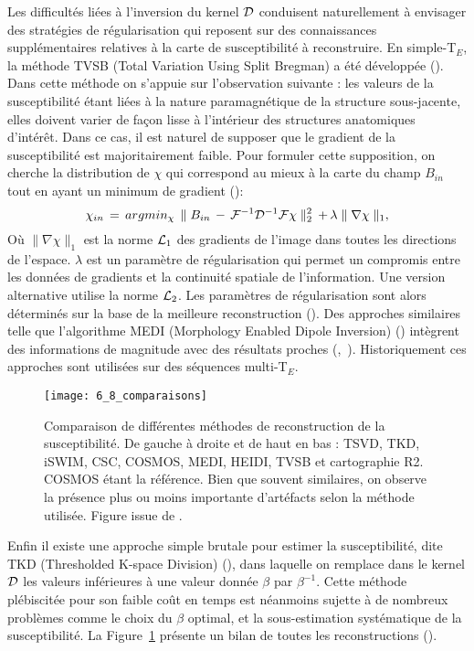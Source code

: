 {Les difficultés liées à l’inversion du kernel ${\cal D}$ conduisent naturellement à envisager des
stratégies de régularisation qui reposent sur des connaissances supplémentaires relatives à la carte de
susceptibilité à reconstruire. En simple-T$_E$, la méthode TVSB (Total Variation Using Split Bregman) a
été développée (\cite{Bilgic2012}). Dans cette méthode on s’appuie sur l’observation suivante : les valeurs de la
susceptibilité étant liées à la nature paramagnétique de la structure sous-jacente, elles doivent varier
de façon lisse à l'intérieur des structures anatomiques d’intérêt. Dans ce cas, il est naturel de supposer
que le gradient de la susceptibilité est majoritairement faible. Pour formuler cette supposition, on cherche la distribution de $\chi$ qui correspond au mieux à la carte du champ $B_{in}$ tout en ayant un
minimum de gradient (\cite{Bilgic2012}):
\begin{equation}
\label{eq:min_gradient}
\chi_{in}\,=\,argmin_{\chi}\,\parallel B_{in}\,-\,{\cal F}^{-1}{\cal D}^{-1}{\cal F}\chi\parallel_2^2\,+\,\lambda\parallel\nabla\chi\parallel_1,
\end{equation}
Où $\parallel\nabla\chi\parallel_1$ est la norme ${\cal L}_1$ des gradients de l'image dans toutes les directions de l'espace. $\lambda$ est un
paramètre de régularisation qui permet un compromis entre les données de gradients et la continuité
spatiale de l'information. Une version alternative utilise la norme ${\cal L}_2$. Les paramètres de régularisation
sont alors déterminés sur la base de la meilleure reconstruction (\cite{Bilgic2012}). Des approches similaires telle
que l’algorithme MEDI (Morphology Enabled Dipole Inversion) (\cite{Liu2011c}) intègrent des informations de
magnitude avec des résultats proches (\cite{DeRochefort2010},~\cite{Schweser2012}). Historiquement ces approches sont utilisées sur des
séquences multi-T$_E$. 
\begin{figure}[!t]
\centering
\texttt{[image: 6\_8\_comparaisons]}
\caption{Comparaison de différentes méthodes de reconstruction de la susceptibilité. De gauche à droite et de haut en
bas : TSVD, TKD, iSWIM, CSC, COSMOS, MEDI, HEIDI, TVSB et cartographie R2. COSMOS étant la référence. Bien que souvent
similaires, on observe la présence plus ou moins importante d’artéfacts selon la méthode utilisée. Figure issue de \cite{Wang_Liu_2014}.}
\label{fig:6_8_comparaisons}	
\end{figure}
Enfin il existe une approche simple brutale pour estimer la susceptibilité, dite TKD
(Thresholded K-space Division) (\cite{Shmueli2009}), dans laquelle on remplace dans le kernel ${\cal D}$ les valeurs inférieures
à une valeur donnée $\beta$ par $\beta^{-1}$. Cette méthode plébiscitée pour son faible coût en temps est néanmoins
sujette à de nombreux problèmes comme le choix du $\beta$ optimal, et la sous-estimation systématique de
la susceptibilité. La Figure~\ref{fig:6_8_comparaisons} présente un bilan de toutes les reconstructions (\cite{Wang_Liu_2014}).

}
